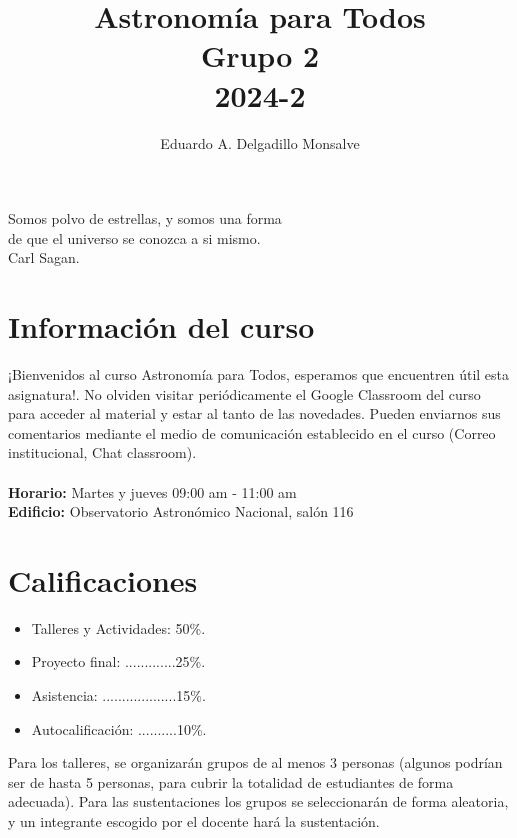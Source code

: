 \documentclass[12pt]{article}
\title{\textbf{Astronomía para Todos}\\ \small Grupo 2\\ 2024-2}
\author[1]{\raggedright Eduardo A. Delgadillo Monsalve}
\affil[1]{\raggedright\small MSc estudiante - Astronomía (eadelgadillom@unal.edu.co) \newline \small Observatorio Astronómico Nacional, Universidad Nacional de Colombia}
\date{}
\begin{document}
\maketitle
\begin{flushright}
    Somos polvo de estrellas, y somos una forma\\ de que el universo se conozca a si mismo.\\ Carl Sagan.
\end{flushright}

\section*{Información del curso}
¡Bienvenidos al curso Astronomía para Todos, esperamos que encuentren útil esta asignatura!. No olviden visitar periódicamente el Google Classroom del curso para acceder al material y estar al tanto de las novedades. Pueden enviarnos sus comentarios mediante el medio de comunicación establecido en el curso (Correo institucional, Chat classroom).\\
\\
\textbf{Horario:} Martes y jueves 09:00 am - 11:00 am\\
\textbf{Edificio:} Observatorio Astronómico Nacional, salón 116

\section*{Calificaciones}
\begin{itemize}
    \item Talleres y Actividades: 50\%.
    \item Proyecto final: .............25\%.
    \item Asistencia: ...................15\%.
    \item Autocalificación: ..........10\%.
\end{itemize}

Para los talleres, se organizarán grupos de al menos 3 personas (algunos podrían ser de hasta 5 personas, para cubrir la totalidad de estudiantes de forma adecuada). Para las sustentaciones los grupos se seleccionarán de forma aleatoria, y un integrante escogido por el docente hará la sustentación.
\end{document}
